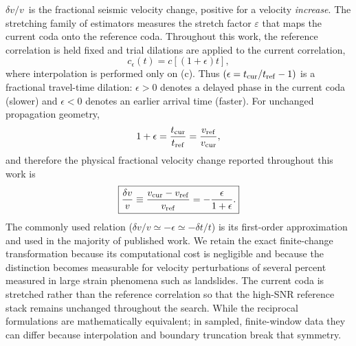 \documentclass[
  referee]{gji}
\providecommand{\dvv}{\ensuremath{\delta v/v}}
\begin{document}
\dvv~is the fractional seismic velocity change, positive for a velocity
\emph{increase}. The stretching family of estimators measures the
stretch factor \(\varepsilon\) that maps the current coda onto the
reference coda. Throughout this work, the reference correlation is held
fixed and trial dilations are applied to the current correlation, \[
c_\epsilon(t)=c[(1+\epsilon)t],
\] where interpolation is performed only on (c). Thus
\((\epsilon=t_{\rm cur}/t_{\rm ref}-1)\) is a fractional travel-time
dilation: \(\epsilon>0\) denotes a delayed phase in the current coda
(slower) and \(\epsilon<0\) denotes an earlier arrival time (faster).
For unchanged propagation geometry, \[
1+\epsilon=\frac{t_{\rm cur}}{t_{\rm ref}}
=\frac{v_{\rm ref}}{v_{\rm cur}},
\] and therefore the physical fractional velocity change reported
throughout this work is \[
\boxed{
\frac{\delta v}{v}
\equiv
\frac{v_{\rm cur}-v_{\rm ref}}{v_{\rm ref}}
=
-\frac{\epsilon}{1+\epsilon}.
}
\] The commonly used relation
(\(\delta v/v\simeq-\epsilon\simeq-\delta t/t\)) is its first-order
approximation and used in the majority of published work. We retain the
exact finite-change transformation because its computational cost is
negligible and because the distinction becomes measurable for velocity
perturbations of several percent measured in large strain phenomena such
as landslides. The current coda is stretched rather than the reference
correlation so that the high-SNR reference stack remains unchanged
throughout the search. While the reciprocal formulations are
mathematically equivalent; in sampled, finite-window data they can
differ because interpolation and boundary truncation break that
symmetry.
\end{document}
